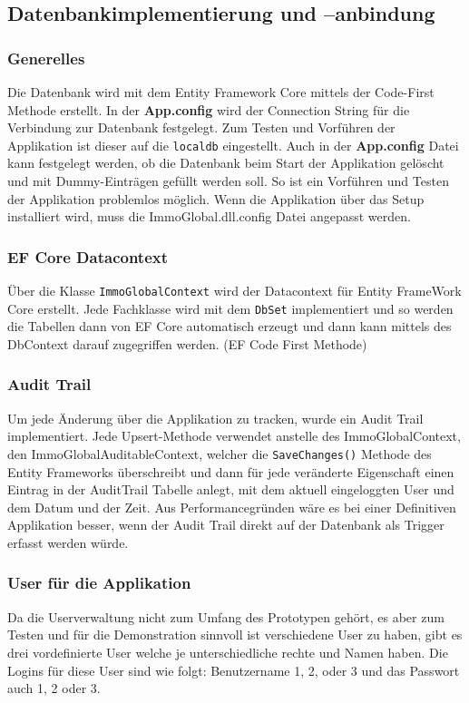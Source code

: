 \newpage
\subsection{Datenbankimplementierung und –anbindung}
\subsubsection{Generelles}
Die Datenbank wird mit dem Entity Framework Core mittels der Code-First Methode erstellt. In der \textbf{App.config} wird der Connection String für die Verbindung zur Datenbank festgelegt. Zum Testen und Vorführen der Applikation ist dieser auf die \verb+localdb+ eingestellt. Auch in der \textbf{App.config} Datei kann festgelegt werden, ob die Datenbank beim Start der Applikation gelöscht und mit Dummy-Einträgen gefüllt werden soll. So ist ein Vorführen und Testen der Applikation problemlos möglich.
Wenn die Applikation über das Setup installiert wird, muss die ImmoGlobal.dll.config Datei angepasst werden.

\subsubsection{EF Core Datacontext}
Über die Klasse \verb+ImmoGlobalContext+  wird der Datacontext für Entity FrameWork Core erstellt. Jede Fachklasse wird mit dem \verb+DbSet+ implementiert und so werden die Tabellen dann von EF Core automatisch erzeugt und dann kann mittels des DbContext darauf zugegriffen werden. (EF Code First Methode)

\subsubsection{Audit Trail}
Um jede Änderung über die Applikation zu tracken, wurde ein Audit Trail implementiert. Jede Upsert-Methode verwendet anstelle des ImmoGlobalContext, den ImmoGlobalAuditableContext, welcher die \verb+SaveChanges()+ Methode des Entity Frameworks überschreibt und dann für jede veränderte Eigenschaft einen Eintrag in der AuditTrail Tabelle anlegt, mit dem aktuell eingeloggten User und dem Datum und der Zeit.
Aus Performancegründen wäre es bei einer Definitiven Applikation besser, wenn der Audit Trail direkt auf der Datenbank als Trigger erfasst werden würde.

\subsubsection{User für die Applikation}
Da die Userverwaltung nicht zum Umfang des Prototypen gehört, es aber zum Testen und für die Demonstration sinnvoll ist verschiedene User zu haben, gibt es drei vordefinierte User welche je unterschiedliche rechte und Namen haben. Die Logins für diese User sind wie folgt: Benutzername 1, 2, oder 3 und das Passwort auch 1, 2 oder 3. 

